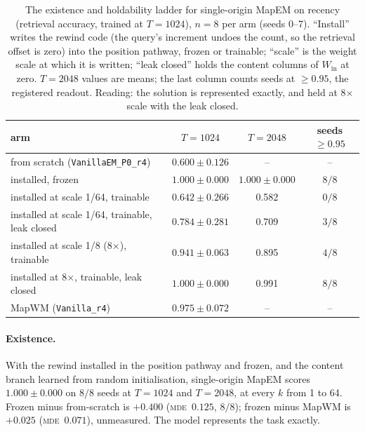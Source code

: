 \documentclass[10pt]{article}
\newcommand{\mde}{\textsc{mde}}
\newcommand{\arm}[1]{\texttt{#1}}
\begin{document}
\begin{table}[t]
\centering
\small
\captionsetup{font=footnotesize,skip=4pt}
\caption{The existence and holdability ladder for single-origin MapEM on recency (retrieval accuracy, trained at $T=1024$), $n=8$ per arm (seeds 0--7). ``Install'' writes the rewind code (the query's increment undoes the count, so the retrieval offset is zero) into the position pathway, frozen or trainable; ``scale'' is the weight scale at which it is written; ``leak closed'' holds the content columns of $W_{\mathrm{in}}$ at zero. $T=2048$ values are means; the last column counts seeds at $\ge0.95$, the registered readout. Reading: the solution is represented exactly, and held at 8$\times$ scale with the leak closed.}
\label{tab:ladder}
\begin{tabular}{@{}lccc@{}}
\toprule
arm & $T=1024$ & $T=2048$ & seeds $\ge0.95$ \\
\midrule
from scratch (\arm{VanillaEM\_P0\_r4})          & $0.600\pm0.126$ & -- & -- \\
installed, frozen                                & $1.000\pm0.000$ & $1.000\pm0.000$ & $8/8$ \\
installed at scale 1/64, trainable               & $0.642\pm0.266$ & 0.582 & $0/8$ \\
installed at scale 1/64, trainable, leak closed  & $0.784\pm0.281$ & 0.709 & $3/8$ \\
installed at scale 1/8 (8$\times$), trainable    & $0.941\pm0.063$ & 0.895 & $4/8$ \\
installed at 8$\times$, trainable, leak closed   & $1.000\pm0.000$ & 0.991 & $8/8$ \\
MapWM (\arm{Vanilla\_r4})                        & $0.975\pm0.072$ & -- & -- \\
\bottomrule
\end{tabular}
\end{table}

\paragraph{Existence.} With the rewind installed in the position pathway and frozen, and the content
branch learned from random initialisation, single-origin MapEM scores $1.000\pm0.000$ on $8/8$ seeds at
$T=1024$ and $T=2048$, at every $k$ from 1 to 64. Frozen minus from-scratch is $+0.400$ (\mde\ $0.125$,
$8/8$); frozen minus MapWM is $+0.025$ (\mde\ $0.071$), unmeasured. The model represents the task exactly.
\end{document}
